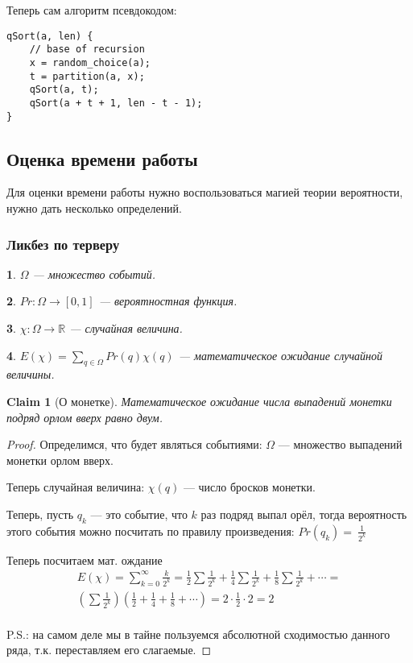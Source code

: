 \documentclass[10pt,a4paper]{article}
\newtheorem*{Cl}{Claim}
\newtheorem*{Def}{\textfrak{Def:}}
\begin{document}
Теперь сам алгоритм псевдокодом:

\begin{lstlisting}
qSort(a, len) {
    // base of recursion
    x = random_choice(a);
    t = partition(a, x);
    qSort(a, t);
    qSort(a + t + 1, len - t - 1);
}
\end{lstlisting}

\subsection{Оценка времени работы}

Для оценки времени работы нужно воспользоваться магией теории вероятности, 
нужно дать несколько определений.

\subsubsection{Ликбез по терверу}

\begin{Def}
$\Omega$ --- множество событий.
\end{Def}

\begin{Def}
$Pr\colon \Omega \rightarrow [0, 1]$ --- вероятностная функция.
\end{Def}

\begin{Def}
$\chi\colon \Omega \rightarrow \mathbb{R}$ --- случайная величина.
\end{Def}

\begin{Def}
$E( \chi ) = \sum\limits_{q \in \Omega} Pr(q) \chi(q)$ --- математическое 
ожидание случайной величины.
\end{Def}

\begin{Cl}[О монетке]
Математическое ожидание числа выпадений монетки подряд орлом вверх равно двум.
\end{Cl}

\begin{proof}
Определимся, что будет являться событиями: $\Omega$ --- множество выпадений 
монетки орлом вверх.

Теперь случайная величина: $\chi(q)$ --- число бросков монетки.

Теперь, пусть $q_k$ --- это событие, что $k$ раз подряд выпал орёл, тогда вероятность 
этого события можно посчитать по правилу произведения: $Pr(q_k) =~ \frac{1}{2^k}$

Теперь посчитаем мат. ождание 
\begin{gather*}
E(\chi) = 
\sum\limits_{k=0}^{\infty} \frac{k}{2^k} =
\frac{1}{2}\sum\frac{1}{2^k} +
\frac{1}{4}\sum\frac{1}{2^k} + 
\frac{1}{8}\sum\frac{1}{2^k} + \cdots = \\
\left(\sum\frac{1}{2^k}\right)
\left(\frac{1}{2} +
\frac{1}{4} + 
\frac{1}{8} + \cdots\right) = 2 \cdot \frac{1}{2} \cdot 2 = 2 \\
\end{gather*}

P.S.: на самом деле мы в тайне пользуемся абсолютной сходимостью данного ряда, 
т.к. переставляем его слагаемые.
\end{proof}
\end{document}
